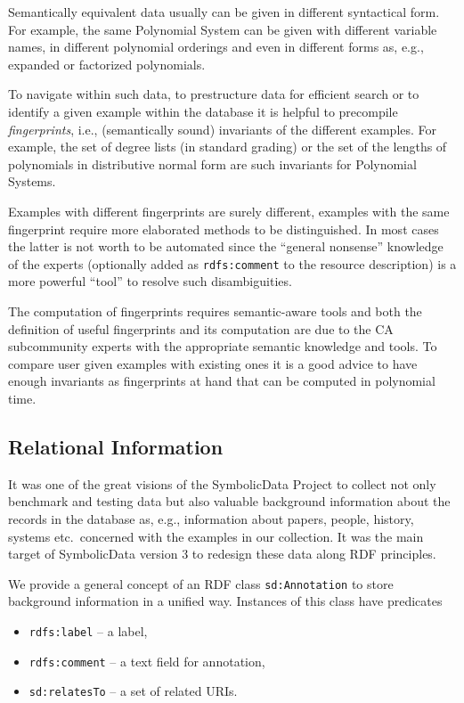 \documentclass{llncs}
\newcommand{\SD}{{\sc Symbolic\-Data}}
\begin{document}
Semantically equivalent data usually can be given in different syntactical
form. For example, the same Polynomial System can be given with different
variable names, in different polynomial orderings and even in different forms
as, e.g., expanded or factorized polynomials.

To navigate within such data, to prestructure data for efficient search or to
identify a given example within the database it is helpful to precompile
\emph{fingerprints}, i.e., (semantically sound) invariants of the different
examples.  For example, the set of degree lists (in standard grading) or the
set of the lengths of polynomials in distributive normal form are such
invariants for Polynomial Systems. 

Examples with different fingerprints are surely different, examples with the
same fingerprint require more elaborated methods to be distinguished.  In most
cases the latter is not worth to be automated since the ``general nonsense''
knowledge of the experts (optionally added as \texttt{rdfs:comment} to the
resource description) is a more powerful ``tool'' to resolve such
disambiguities.

The computation of fingerprints requires semantic-aware tools and both the
definition of useful fingerprints and its computation are due to the CA
subcommunity experts with the appropriate semantic knowledge and tools.  To
compare user given examples with existing ones it is a good advice to have
enough invariants as fingerprints at hand that can be computed in polynomial
time. 

\subsection{Relational Information}

It was one of the great visions of the {\SD} Project to collect not only
benchmark and testing data but also valuable background information about the
records in the database as, e.g., information about papers, people, history,
systems etc.\ concerned with the examples in our collection.  It was the main
target of {\SD} version 3 to redesign these data along RDF principles.

We provide a general concept of an RDF class \texttt{sd:Annotation} to store
background information in a unified way.  Instances of this class have
predicates
\begin{itemize}
\item \texttt{rdfs:label} -- a label,
\item \texttt{rdfs:comment} -- a text field for annotation,
\item \texttt{sd:relatesTo} -- a set of related URIs.
\end{itemize}
\end{document}
